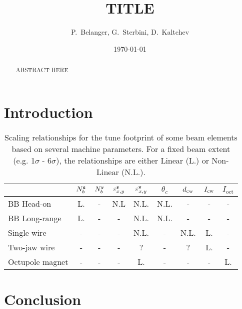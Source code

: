 \documentclass{cernatsnote}
\title{TITLE}
\author{P.~Belanger, G.~Sterbini, D.~Kaltchev}
\date{\today}
\newcommand{\weak}{{\texttt{\scriptsize w}}}
\newcommand{\strong}{{\texttt{\scriptsize s}}}
\newcommand{\wire}{{\text{\scriptsize cw}}}
\begin{document}
\maketitle

\begin{abstract}
ABSTRACT HERE
\end{abstract}



\section{Introduction}



\begin{table}[h!]
\captionsetup{width=.9\linewidth}
\caption{Scaling relationships for the tune footprint of some beam elements based on several machine parameters. For a fixed beam extent {(e.g. 1$\sigma$ - $6\sigma$)}, the relationships are either Linear (L.) or Non-Linear (N.L.).}
\centering
\begin{adjustbox}{max width=\linewidth}
\begin{tabular}{lcccccccc}
\toprule
        & $N_b^\strong$ & $N_b^\weak$ & $\varepsilon_{x,y}^\strong$ & $\varepsilon_{x,y}^\weak$ & $\theta_c$ & $d_\wire$ & $I_\wire$ & $I_\text{oct}$$$\\
\toprule
BB Head-on      &   L.   &   -   &   N.L     &   N.L.     &   N.L.  &   -   &   -   &   -  \\
BB Long-range   &   L.   &   -   &   -       &   N.L.     &   N.L.  &   -   &   -   &   -  \\
Single wire     &   -    &   -   &   -       &   N.L.     &   -     &   N.L.&   L.  &   -  \\
Two-jaw wire    &   -    &   -   &   -       &   ?        &   -     &   ?   &   L.  &   -  \\
Octupole magnet &   -    &   -   &   -       &   L.       &   -     &   -   &   -   &   L.  \\


\bottomrule
\end{tabular}
\label{tab:dust_charge_example}
\end{adjustbox}
\end{table}


\section{Conclusion}



%
%
\end{document}
